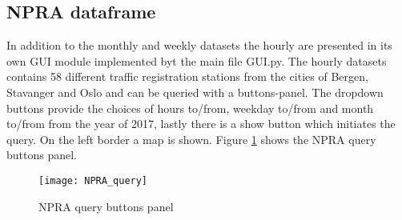 \subsection{NPRA dataframe}
In addition to the monthly and weekly datasets the hourly are presented in its own GUI module implemented byt the main file GUI.py. The hourly datasets contains 58 different traffic registration stations from the cities of Bergen, Stavanger and Oslo and can be queried with a buttons-panel. The dropdown buttons provide the choices of hours to/from, weekday to/from and month to/from from the year of 2017, lastly there is a show button which initiates the query. On the left border a map is shown.
Figure \ref{fig:NPRA_query} shows the NPRA query buttons panel.

\begin{figure}[ht]
\texttt{[image: NPRA\_query]}
\centering
\caption{NPRA query buttons panel}
\label{fig:NPRA_query}
\end{figure}




